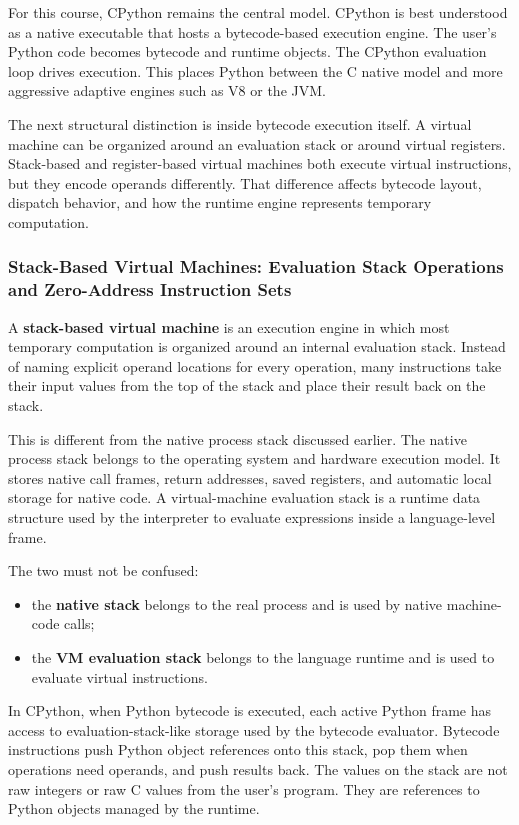 \documentclass[a4paper,twoside]{report}
\begin{document}
For this course, CPython remains the central model. CPython is best understood as a native executable that hosts a bytecode-based execution engine. The user's Python code becomes bytecode and runtime objects. The CPython evaluation loop drives execution. This places Python between the C native model and more aggressive adaptive engines such as V8 or the JVM.

The next structural distinction is inside bytecode execution itself. A virtual machine can be organized around an evaluation stack or around virtual registers. Stack-based and register-based virtual machines both execute virtual instructions, but they encode operands differently. That difference affects bytecode layout, dispatch behavior, and how the runtime engine represents temporary computation.





\subsubsection{Stack-Based Virtual Machines: Evaluation Stack Operations and Zero-Address Instruction Sets}

A \textbf{stack-based virtual machine} is an execution engine in which most temporary computation is organized around an internal evaluation stack. Instead of naming explicit operand locations for every operation, many instructions take their input values from the top of the stack and place their result back on the stack.

This is different from the native process stack discussed earlier. The native process stack belongs to the operating system and hardware execution model. It stores native call frames, return addresses, saved registers, and automatic local storage for native code. A virtual-machine evaluation stack is a runtime data structure used by the interpreter to evaluate expressions inside a language-level frame.

The two must not be confused:

\begin{itemize}
    \item the \textbf{native stack} belongs to the real process and is used by native machine-code calls;
    \item the \textbf{VM evaluation stack} belongs to the language runtime and is used to evaluate virtual instructions.
\end{itemize}

In CPython, when Python bytecode is executed, each active Python frame has access to evaluation-stack-like storage used by the bytecode evaluator. Bytecode instructions push Python object references onto this stack, pop them when operations need operands, and push results back. The values on the stack are not raw integers or raw C values from the user's program. They are references to Python objects managed by the runtime.
\end{document}
